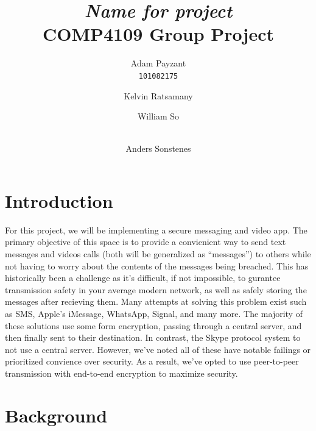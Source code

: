 \documentclass[titlepage]{article}
\title{\textit{Name for project} \\
    \large COMP4109 Group Project
}
\author{Adam Payzant \\ 
    \texttt{101082175} \\
    \and
    Kelvin Ratsamany \\
    \texttt{}
    \and
    William So \\ 
    \texttt{} \\
    \and
    Anders Sonstenes \\ 
    \texttt{}
}
\begin{document}
    \maketitle

    \section{Introduction}

    For this project, we will be implementing a secure messaging and video app.
    The primary objective of this space is to provide a convienient way to send text messages and videos calls (both will be generalized as ``messages'') to others while not having to worry about the contents of the messages being breached.
    This has historically been a challenge as it's difficult, if not impossible, to gurantee transmission safety in your average modern network, as well as safely storing the messages after recieving them.
    Many attempts at solving this problem exist such as SMS, Apple's iMessage, WhatsApp, Signal, and many more.
    The majority of these solutions use some form encryption, passing through a central server, and then finally sent to their destination.
    In contrast, the Skype protocol system to not use a central server.
    However, we've noted all of these have notable failings or prioritized convience over security.
    As a result, we've opted to use peer-to-peer transmission with end-to-end encryption to maximize security.

    \section{Background}
\end{document}
